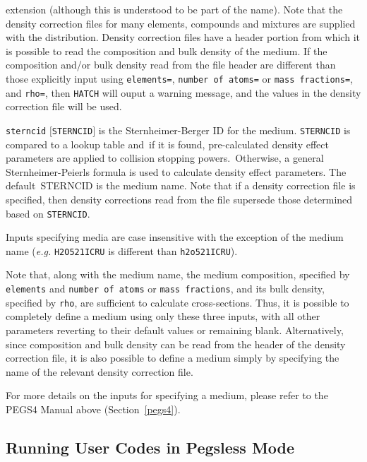 \begin{description}
\begin{description}
extension (although this is understood to be part of the name).  Note that the density correction files for many elements, compounds
and mixtures are supplied with
the distribution.  Density correction files have a header portion from which it is possible to read the composition and bulk
density of the medium.  If the composition and/or bulk density read from the file header are different than those explicitly input
using {\tt elements=}, {\tt number of atoms=} or {\tt mass fractions=}, and {\tt rho=}, then {\tt HATCH} will ouput a warning
message, and the values in the density correction file will be used.
\item {\tt sterncid} $[${\tt STERNCID}$]$  is the Sternheimer-Berger ID for the medium. {\tt STERNCID} is compared to a lookup table and\
if it is found, pre-calculated density effect parameters are applied to collision stopping powers.\
Otherwise, a general Sternheimer-Peierls formula is used to calculate density effect parameters.  The default\
STERNCID is the medium name.  Note that if a density correction file is specified, then density corrections read from the file
supersede those determined based on {\tt STERNCID}.
\end{description}
\end{description}

Inputs specifying media are case insensitive with the exception of the medium name ({\it e.g.} {\tt H2O521ICRU} is
different than {\tt h2o521ICRU}).

Note that, along with the medium name, the medium composition, specified by {\tt elements} and {\tt number of atoms} or {\tt mass fractions}, and its bulk density, specified by {\tt rho}, are
sufficient to calculate cross-sections.  Thus, it is possible to completely define a medium
using only these three inputs, with all other parameters reverting to their default values or remaining blank.
Alternatively, since composition and bulk density can be read from the header of the density correction file, it is also possible to define a medium
simply by specifying the name of the relevant density correction file.

For more details on the inputs for specifying a medium, please refer to the PEGS4 Manual above (Section~\ref{pegs4}).

\subsection {Running User Codes in Pegsless Mode}

